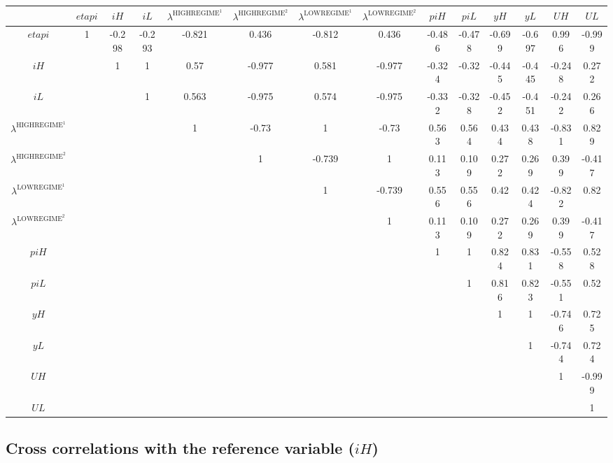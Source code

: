 \begin{tabular}{c|ccccccccccccc|}
  & ${e\!t\!a\!p\!i}$ & ${i\!H}$ & ${i\!L}$ & $\lambda^{\mathrm{HIGHREGIME}^{\mathrm{1}}}$ & $\lambda^{\mathrm{HIGHREGIME}^{\mathrm{2}}}$ & $\lambda^{\mathrm{LOWREGIME}^{\mathrm{1}}}$ & $\lambda^{\mathrm{LOWREGIME}^{\mathrm{2}}}$ & ${p\!i\!H}$ & ${p\!i\!L}$ & ${y\!H}$ & ${y\!L}$ & ${U\!H}$ & ${U\!L}$\\
\hline
${e\!t\!a\!p\!i}$ & 1 & -0.298 & -0.293 & -0.821 & 0.436 & -0.812 & 0.436 & -0.486 & -0.478 & -0.699 & -0.697 & 0.996 & -0.999 \\
${i\!H}$ &  & 1 & 1 & 0.57 & -0.977 & 0.581 & -0.977 & -0.324 & -0.32 & -0.445 & -0.445 & -0.248 & 0.272 \\
${i\!L}$ &  &  & 1 & 0.563 & -0.975 & 0.574 & -0.975 & -0.332 & -0.328 & -0.452 & -0.451 & -0.242 & 0.266 \\
$\lambda^{\mathrm{HIGHREGIME}^{\mathrm{1}}}$ &  &  &  & 1 & -0.73 & 1 & -0.73 & 0.563 & 0.564 & 0.434 & 0.438 & -0.831 & 0.829 \\
$\lambda^{\mathrm{HIGHREGIME}^{\mathrm{2}}}$ &  &  &  &  & 1 & -0.739 & 1 & 0.113 & 0.109 & 0.272 & 0.269 & 0.399 & -0.417 \\
$\lambda^{\mathrm{LOWREGIME}^{\mathrm{1}}}$ &  &  &  &  &  & 1 & -0.739 & 0.556 & 0.556 & 0.42 & 0.424 & -0.822 & 0.82 \\
$\lambda^{\mathrm{LOWREGIME}^{\mathrm{2}}}$ &  &  &  &  &  &  & 1 & 0.113 & 0.109 & 0.272 & 0.269 & 0.399 & -0.417 \\
${p\!i\!H}$ &  &  &  &  &  &  &  & 1 & 1 & 0.824 & 0.831 & -0.558 & 0.528 \\
${p\!i\!L}$ &  &  &  &  &  &  &  &  & 1 & 0.816 & 0.823 & -0.551 & 0.52 \\
${y\!H}$ &  &  &  &  &  &  &  &  &  & 1 & 1 & -0.746 & 0.725 \\
${y\!L}$ &  &  &  &  &  &  &  &  &  &  & 1 & -0.744 & 0.724 \\
${U\!H}$ &  &  &  &  &  &  &  &  &  &  &  & 1 & -0.999 \\
${U\!L}$ &  &  &  &  &  &  &  &  &  &  &  &  & 1 \\
\hline
\end{tabular}


\subsection{Cross correlations with the reference variable (${i\!H}$)}

